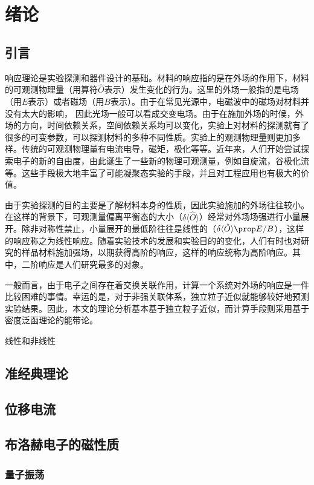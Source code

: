 \chapter{绪论}
\label{cha:intro}

\section{引言}

响应理论是实验探测和器件设计的基础。材料的响应指的是在外场的作用下，材料的可观测物理量（用算符$\hat{O}$表示）发生变化的行为。这里的外场一般指的是电场（用$E$表示）或者磁场（用$B$表示）。由于在常见光源中，电磁波中的磁场对材料并没有太大的影响， 因此光场一般可以看成交变电场。由于在施加外场的时候，外场的方向，时间依赖关系，空间依赖关系均可以变化，实验上对材料的探测就有了很多的可变参数，可以探测材料的多种不同性质。实验上的观测物理量则更加多样。传统的可观测物理量有电流电导，磁矩，极化等等。近年来，人们开始尝试探索电子的新的自由度，由此诞生了一些新的物理可观测量，例如自旋流，谷极化流等。这些手段极大地丰富了可能凝聚态实验的手段，并且对工程应用也有极大的价值。


由于实验探测的目的主要是了解材料本身的性质，因此实验施加的外场往往较小。在这样的背景下，可观测量偏离平衡态的大小（$\delta\langle\hat{O}\rangle$）经常对外场场强进行小量展开。除非对称性禁止，小量展开的最低阶往往是线性的（$\delta\langle\hat{O}\rangle \prop E/B$），这样的响应称之为线性响应。随着实验技术的发展和实验目的的变化，人们有时也对研究的样品材料施加强场，以期获得高阶的响应，这样的响应统称为高阶响应。其中，二阶响应是人们研究最多的对象。

一般而言，由于电子之间存在着交换关联作用，计算一个系统对外场的响应是一件比较困难的事情。幸运的是，对于非强关联体系，独立粒子近似就能够较好地预测实验结果。因此，本文的理论分析基本基于独立粒子近似，而计算手段则采用基于密度泛函理论的能带论。



线性和非线性



\section{准经典理论}
\section{位移电流}
\section{布洛赫电子的磁性质}
\subsection{量子振荡}